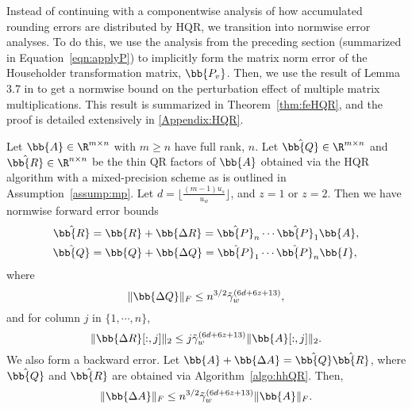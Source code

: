 Instead of continuing with a componentwise analysis of how accumulated rounding errors are distributed by HQR, we transition into normwise error analyses.
To do this, we use the analysis from the preceding section (summarized in Equation~\ref{eqn:applyP}) to implicitly form the matrix norm error of the Householder transformation matrix, $\bb{P_v}$.
Then, we use the result of Lemma 3.7 in \cite{Higham2002} to get a normwise bound on the perturbation effect of multiple matrix multiplications.
This result is summarized in Theorem~\ref{thm:feHQR}, and the proof is detailed extensively in \ref{Appendix:HQR}.

\begin{theorem}
	\label{thm:feHQR}
	Let $\bb{A}\in\R^{m\times n}$ with $m\geq n$ have full rank, $n$. 
	Let $\hat{\bb{Q}}\in\R^{m\times n}$ and $\hat{\bb{R}}\in\R^{n\times n}$ be the thin QR factors of $\bb{A}$ obtained via the HQR algorithm with a mixed-precision scheme as is outlined in Assumption~\ref{assump:mp}.
	Let $d=\lfloor\frac{(m-1) u_s}{u_w}\rfloor$, and $z=1$ or $z=2$. 
	Then we have normwise forward error bounds
	\begin{align}
	\hat{\bb{R}} &= \bb{R} + \bb{\Delta R} = \hat{\bb{P}}_n\cdots\hat{\bb{P}}_1 \bb{A},\\
	\hat{\bb{Q}} &= \bb{Q} + \bb{\Delta Q} = \hat{\bb{P}}_1\cdots\hat{\bb{P}}_n \bb{I},
	\end{align}
	where
	\begin{equation}
	  \|\bb{\Delta Q}\|_F \leq n^{3/2} \tilde{\gamma}_w^{(6d+6z+13)},
	\end{equation}
	and for column $j$ in $\{1, \cdots, n\}$,
	\begin{equation}
	\|\bb{\Delta R}[:,j]\|_2 \leq j\tilde{\gamma}_w^{(6d+6z+13)}\|\bb{A}[:,j]\|_2.
	\end{equation}
	We also form a backward error.
	Let $\bb{A}+\bb{\Delta A} = \hat{\bb{Q}}\hat{\bb{R}}$, where $\hat{\bb{Q}}$ and $\hat{\bb{R}}$ are obtained via Algorithm~\ref{algo:hhQR}.
	Then,
	\begin{equation}
	\|\bb{\Delta A}\|_F \leq n^{3/2}\tilde{\gamma}_w^{(6d+6z+13)}\|\bb{A}\|_F.
	\end{equation}
\end{theorem}

